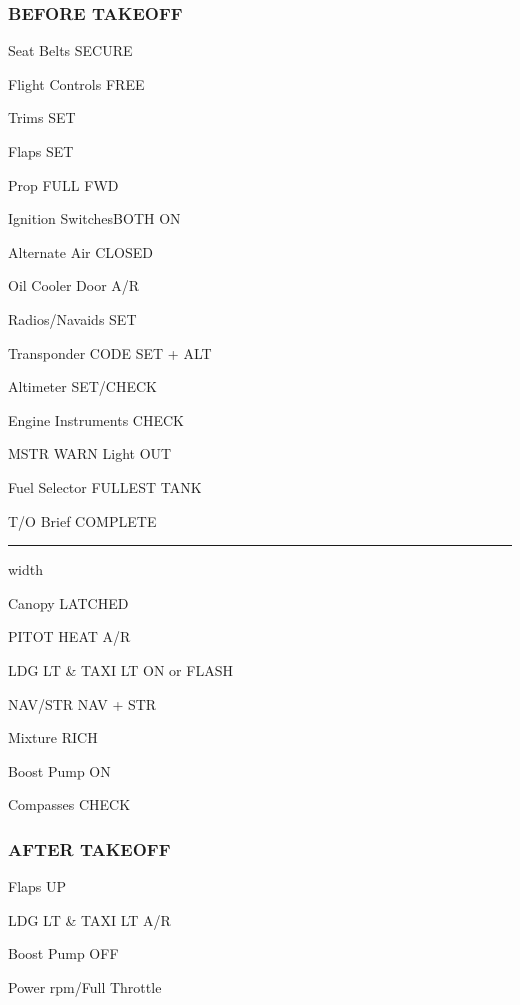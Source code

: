 \begin{multicols}{2}
\subsubsection*{BEFORE TAKEOFF}
\begin{enumerate*}
\item Seat Belts \dotfill SECURE
\item Flight Controls \dotfill FREE
\item Trims \dotfill SET
\item Flaps \dotfill SET
\item Prop \dotfill FULL FWD
\item Ignition Switches\dotfill BOTH ON
\item Alternate Air \dotfill CLOSED
\item Oil Cooler Door \dotfill A/R
\item Radios/Navaids \dotfill SET
\item Transponder \dotfill CODE SET + ALT
\item Altimeter \dotfill SET/CHECK
\item Engine Instruments \dotfill CHECK
\item MSTR WARN Light \dotfill OUT
\item Fuel Selector \dotfill FULLEST TANK
\item T/O Brief \dotfill COMPLETE\vspace{0.5ex}
\hrule width \columnwidth \vspace{1ex}
\item Canopy \dotfill LATCHED
\item PITOT HEAT \dotfill A/R
\item LDG LT \& TAXI LT \dotfill ON or FLASH
\item NAV/STR \dotfill NAV + STR
\item Mixture \dotfill RICH
\item Boost Pump \dotfill ON
\item Compasses \dotfill CHECK
\end{enumerate*}

\subsubsection*{AFTER TAKEOFF}
\begin{enumerate*}
\item Flaps \dotfill UP
\item LDG LT \& TAXI LT \dotfill A/R
\item Boost Pump \dotfill OFF
\item Power  rpm/Full Throttle
\end{enumerate*}


\end{multicols}
